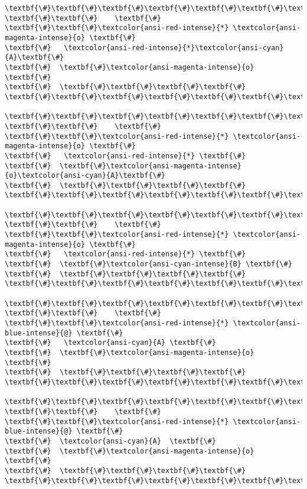 \documentclass[11pt]{article}
\begin{document}
\begin{Verbatim}[commandchars=\\\{\}]
\textbf{\#}\textbf{\#}\textbf{\#}\textbf{\#}\textbf{\#}\textbf{\#}\textbf{\#}
\textbf{\#}\textbf{\#}    \textbf{\#}
\textbf{\#}\textbf{\#}\textcolor{ansi-red-intense}{*} \textcolor{ansi-magenta-intense}{o} \textbf{\#}
\textbf{\#}   \textcolor{ansi-red-intense}{*}\textcolor{ansi-cyan}{A}\textbf{\#}
\textbf{\#}  \textbf{\#}\textcolor{ansi-magenta-intense}{o} \textbf{\#}
\textbf{\#}  \textbf{\#}\textbf{\#}\textbf{\#}\textbf{\#}
\textbf{\#}\textbf{\#}\textbf{\#}\textbf{\#}\textbf{\#}\textbf{\#}\textbf{\#}

\textbf{\#}\textbf{\#}\textbf{\#}\textbf{\#}\textbf{\#}\textbf{\#}\textbf{\#}
\textbf{\#}\textbf{\#}    \textbf{\#}
\textbf{\#}\textbf{\#}\textcolor{ansi-red-intense}{*} \textcolor{ansi-magenta-intense}{o} \textbf{\#}
\textbf{\#}   \textcolor{ansi-red-intense}{*} \textbf{\#}
\textbf{\#}  \textbf{\#}\textcolor{ansi-magenta-intense}{o}\textcolor{ansi-cyan}{A}\textbf{\#}
\textbf{\#}  \textbf{\#}\textbf{\#}\textbf{\#}\textbf{\#}
\textbf{\#}\textbf{\#}\textbf{\#}\textbf{\#}\textbf{\#}\textbf{\#}\textbf{\#}

\textbf{\#}\textbf{\#}\textbf{\#}\textbf{\#}\textbf{\#}\textbf{\#}\textbf{\#}
\textbf{\#}\textbf{\#}    \textbf{\#}
\textbf{\#}\textbf{\#}\textcolor{ansi-red-intense}{*} \textcolor{ansi-magenta-intense}{o} \textbf{\#}
\textbf{\#}   \textcolor{ansi-red-intense}{*} \textbf{\#}
\textbf{\#}  \textbf{\#}\textcolor{ansi-cyan-intense}{B} \textbf{\#}
\textbf{\#}  \textbf{\#}\textbf{\#}\textbf{\#}\textbf{\#}
\textbf{\#}\textbf{\#}\textbf{\#}\textbf{\#}\textbf{\#}\textbf{\#}\textbf{\#}

\textbf{\#}\textbf{\#}\textbf{\#}\textbf{\#}\textbf{\#}\textbf{\#}\textbf{\#}
\textbf{\#}\textbf{\#}    \textbf{\#}
\textbf{\#}\textbf{\#}\textcolor{ansi-red-intense}{*} \textcolor{ansi-blue-intense}{@} \textbf{\#}
\textbf{\#}   \textcolor{ansi-cyan}{A} \textbf{\#}
\textbf{\#}  \textbf{\#}\textcolor{ansi-magenta-intense}{o} \textbf{\#}
\textbf{\#}  \textbf{\#}\textbf{\#}\textbf{\#}\textbf{\#}
\textbf{\#}\textbf{\#}\textbf{\#}\textbf{\#}\textbf{\#}\textbf{\#}\textbf{\#}

\textbf{\#}\textbf{\#}\textbf{\#}\textbf{\#}\textbf{\#}\textbf{\#}\textbf{\#}
\textbf{\#}\textbf{\#}    \textbf{\#}
\textbf{\#}\textbf{\#}\textcolor{ansi-red-intense}{*} \textcolor{ansi-blue-intense}{@} \textbf{\#}
\textbf{\#}  \textcolor{ansi-cyan}{A}  \textbf{\#}
\textbf{\#}  \textbf{\#}\textcolor{ansi-magenta-intense}{o} \textbf{\#}
\textbf{\#}  \textbf{\#}\textbf{\#}\textbf{\#}\textbf{\#}
\textbf{\#}\textbf{\#}\textbf{\#}\textbf{\#}\textbf{\#}\textbf{\#}\textbf{\#}


\end{Verbatim}
\end{document}
